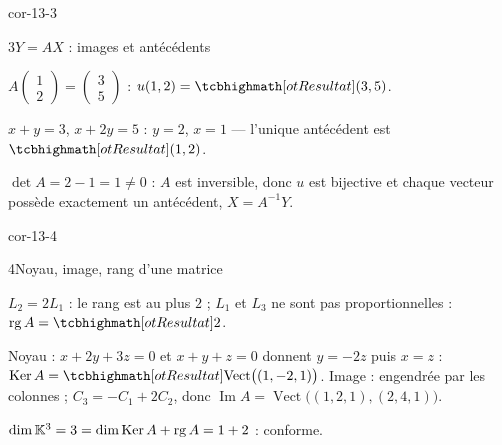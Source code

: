 \begin{blocLivre}{cor-13-3}
\begin{corrige}{3}{$Y=AX$ : images et antécédents}
\begin{questions}
  \item $A\begin{pmatrix}1\\2\end{pmatrix}=\begin{pmatrix}3\\5\end{pmatrix}$ :
    $u(1,2)=\res{(3,5)}$.
  \item $x+y=3$, $x+2y=5$ : $y=2$, $x=1$ — l'unique antécédent est
    $\res{(1,2)}$.
  \item $\det A=2-1=1\neq0$ : $A$ est inversible, donc $u$ est bijective
    et chaque vecteur possède exactement un antécédent, $X=A^{-1}Y$.
\end{questions}
\end{corrige}
\end{blocLivre}

\begin{blocLivre}{cor-13-4}
\begin{corrige}{4}{Noyau, image, rang d'une matrice}
\begin{questions}
  \item $L_2=2L_1$ : le rang est au plus $2$ ; $L_1$ et $L_3$ ne sont pas
    proportionnelles : $\operatorname{rg}A=\res{2}$.
  \item Noyau : $x+2y+3z=0$ et $x+y+z=0$ donnent $y=-2z$ puis $x=z$ :
    $\operatorname{Ker}A=\res{\operatorname{Vect}\bigl((1,-2,1)\bigr)}$.
    Image : engendrée par les colonnes ;
    $C_3=-C_1+2C_2$, donc
    $\operatorname{Im}A=\operatorname{Vect}\bigl((1,2,1),(2,4,1)\bigr)$.
  \item $\dim\mathbb{K}^{3}=3=\dim\operatorname{Ker}A+\operatorname{rg}A=1+2$ :
    conforme.
\end{questions}
\end{corrige}
\end{blocLivre}

